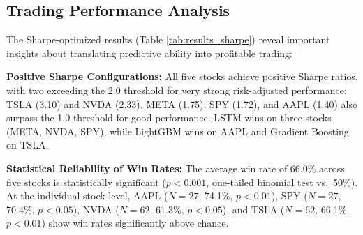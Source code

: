\documentclass[a4paper,10pt,conference]{IEEEtran}
\begin{document}


\subsection{Trading Performance Analysis}

The Sharpe-optimized results (Table \ref{tab:results_sharpe}) reveal important insights about translating predictive ability into profitable trading:

\textbf{Positive Sharpe Configurations:}
All five stocks achieve positive Sharpe ratios, with two exceeding the 2.0 threshold for very strong risk-adjusted performance: TSLA (3.10) and NVDA (2.33). META (1.75), SPY (1.72), and AAPL (1.40) also surpass the 1.0 threshold for good performance. LSTM wins on three stocks (META, NVDA, SPY), while LightGBM wins on AAPL and Gradient Boosting on TSLA.

\textbf{Statistical Reliability of Win Rates:} The average win rate of 66.0\% across five stocks is statistically significant ($p < 0.001$, one-tailed binomial test vs.\ 50\%). At the individual stock level, AAPL ($N=27$, 74.1\%, $p < 0.01$), SPY ($N=27$, 70.4\%, $p < 0.05$), NVDA ($N=62$, 61.3\%, $p < 0.05$), and TSLA ($N=62$, 66.1\%, $p < 0.01$) show win rates significantly above chance.
\end{document}

